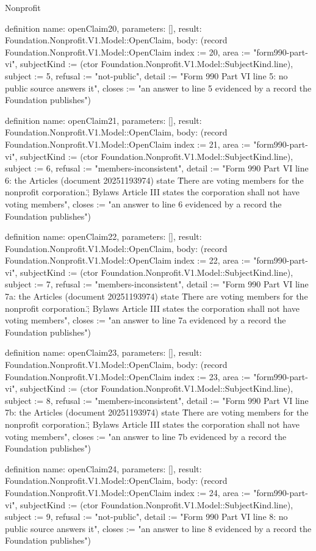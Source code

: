 \begin{lexlean}{Nonprofit}
\begin{semanticmodule}
definition{
  name: openClaim20,
  parameters: [],
  result: Foundation.Nonprofit.V1.Model::OpenClaim,
  body: (record Foundation.Nonprofit.V1.Model::OpenClaim {index := 20, area := "form990-part-vi", subjectKind := (ctor Foundation.Nonprofit.V1.Model::SubjectKind.line), subject := 5, refusal := "not-public", detail := "Form 990 Part VI line 5: no public source answers it", closes := "an answer to line 5 evidenced by a record the Foundation publishes"})
}

definition{
  name: openClaim21,
  parameters: [],
  result: Foundation.Nonprofit.V1.Model::OpenClaim,
  body: (record Foundation.Nonprofit.V1.Model::OpenClaim {index := 21, area := "form990-part-vi", subjectKind := (ctor Foundation.Nonprofit.V1.Model::SubjectKind.line), subject := 6, refusal := "members-inconsistent", detail := "Form 990 Part VI line 6: the Articles (document 20251193974) state \"There are voting members for the nonprofit corporation.\"; Bylaws Article III states the corporation shall not have voting members", closes := "an answer to line 6 evidenced by a record the Foundation publishes"})
}

definition{
  name: openClaim22,
  parameters: [],
  result: Foundation.Nonprofit.V1.Model::OpenClaim,
  body: (record Foundation.Nonprofit.V1.Model::OpenClaim {index := 22, area := "form990-part-vi", subjectKind := (ctor Foundation.Nonprofit.V1.Model::SubjectKind.line), subject := 7, refusal := "members-inconsistent", detail := "Form 990 Part VI line 7a: the Articles (document 20251193974) state \"There are voting members for the nonprofit corporation.\"; Bylaws Article III states the corporation shall not have voting members", closes := "an answer to line 7a evidenced by a record the Foundation publishes"})
}

definition{
  name: openClaim23,
  parameters: [],
  result: Foundation.Nonprofit.V1.Model::OpenClaim,
  body: (record Foundation.Nonprofit.V1.Model::OpenClaim {index := 23, area := "form990-part-vi", subjectKind := (ctor Foundation.Nonprofit.V1.Model::SubjectKind.line), subject := 8, refusal := "members-inconsistent", detail := "Form 990 Part VI line 7b: the Articles (document 20251193974) state \"There are voting members for the nonprofit corporation.\"; Bylaws Article III states the corporation shall not have voting members", closes := "an answer to line 7b evidenced by a record the Foundation publishes"})
}

definition{
  name: openClaim24,
  parameters: [],
  result: Foundation.Nonprofit.V1.Model::OpenClaim,
  body: (record Foundation.Nonprofit.V1.Model::OpenClaim {index := 24, area := "form990-part-vi", subjectKind := (ctor Foundation.Nonprofit.V1.Model::SubjectKind.line), subject := 9, refusal := "not-public", detail := "Form 990 Part VI line 8: no public source answers it", closes := "an answer to line 8 evidenced by a record the Foundation publishes"})
}


\end{semanticmodule}
\end{lexlean}
